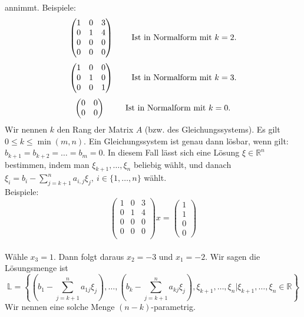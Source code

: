 \documentclass{article}
\newcommand{\R}{\mathbb{R}}
\newcommand{\Rn}{\mathbb{R}^n\ }
\begin{document}
annimmt. Beispiele:\\
$$
\begin{pmatrix}
1 & 0 & 3\\
0 & 1 & 4\\
0 & 0 & 0\\
0 & 0 & 0\\
\end{pmatrix}\text{\hspace{.75cm}Ist in Normalform mit $k = 2$.}
$$
$$
\begin{pmatrix}
1 & 0 & 0\\
0 & 1 & 0\\
0 & 0 & 1\\
\end{pmatrix}\text{\hspace{.75cm}Ist in Normalform mit $k = 3$.}
$$
$$
\begin{pmatrix}
0 & 0\\
0 & 0\\
\end{pmatrix}\text{\hspace{.75cm} Ist in Normalform mit $k = 0$.}
$$
Wir nennen $k$ den Rang der Matrix $A$ (bzw. des Gleichungssystems). Es gilt $0 \le k \le \min(m, n) $.
Ein Gleichungssystem ist genau dann lösbar,  wenn gilt: $b_{k+1} = b_{k+2} = \ldots = b_m = 0$. 
In diesem Fall lässt sich eine Lösung $\xi \in \Rn$ bestimmen,  indem man $\xi_{k+1}, \dots, \xi_n$ beliebig wählt, und danach $\xi_i = b_i -  \sum_{j=k+1}^n a_{i,j} \xi_j, \ i\in\{1,\dots,n\}$ wählt.\\
Beispiele:
$$
\begin{pmatrix}
1 & 0 & 3\\
0 & 1 & 4\\
0 & 0 & 0\\
0 & 0 & 0\\
\end{pmatrix} x =
\begin{pmatrix}
1\\1\\0\\0
\end{pmatrix}
$$\\
Wähle $x_3 = 1$. Dann folgt daraus $x_2 = -3$ und $x_1 = -2$. Wir sagen die Lösungsmenge ist \\
$$\mathbb{L} =\left\{\left(b_1 - \sum_{j=k+1}^na_{1j}\xi_j\right), \dots,  \left(b_k - \sum_{j=k+1}^{n}a_{kj}\xi_j\right), \xi_{k+1}, \dots, \xi_n \Big| \xi_{k+1}, \dots, \xi_n \in \R\right\}$$
Wir nennen eine solche Menge $(n-k)$-parametrig.
\end{document}

